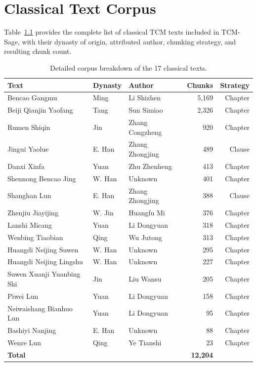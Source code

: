 \documentclass[11pt,a4paper]{report}
\begin{document}
\appendix
\chapter{Classical Text Corpus}

Table~\ref{tab:corpus_detail} provides the complete list of classical TCM texts included in TCM-Sage, with their dynasty of origin, attributed author, chunking strategy, and resulting chunk count.

\begin{table}[H]
\centering
\caption{Detailed corpus breakdown of the 17 classical texts.}
\label{tab:corpus_detail}
\begin{tabularx}{\textwidth}{lllrr}
\toprule
\textbf{Text} & \textbf{Dynasty} & \textbf{Author} & \textbf{Chunks} & \textbf{Strategy} \\
\midrule
Bencao Gangmu & Ming & Li Shizhen & 5,169 & Chapter \\
Beiji Qianjin Yaofang & Tang & Sun Simiao & 2,326 & Chapter \\
Rumen Shiqin & Jin & Zhang Congzheng & 920 & Chapter \\
Jingui Yaolue & E. Han & Zhang Zhongjing & 489 & Clause \\
Danxi Xinfa & Yuan & Zhu Zhenheng & 413 & Chapter \\
Shennong Bencao Jing & W. Han & Unknown & 401 & Chapter \\
Shanghan Lun & E. Han & Zhang Zhongjing & 388 & Clause \\
Zhenjiu Jiayijing & W. Jin & Huangfu Mi & 376 & Chapter \\
Lanshi Micang & Yuan & Li Dongyuan & 318 & Chapter \\
Wenbing Tiaobian & Qing & Wu Jutong & 313 & Chapter \\
Huangdi Neijing Suwen & W. Han & Unknown & 295 & Chapter \\
Huangdi Neijing Lingshu & W. Han & Unknown & 227 & Chapter \\
Suwen Xuanji Yuanbing Shi & Jin & Liu Wansu & 205 & Chapter \\
Piwei Lun & Yuan & Li Dongyuan & 158 & Chapter \\
Neiwaishang Bianhuo Lun & Yuan & Li Dongyuan & 95 & Chapter \\
Bashiyi Nanjing & E. Han & Unknown & 88 & Chapter \\
Wenre Lun & Qing & Ye Tianshi & 23 & Chapter \\
\midrule
\textbf{Total} & & & \textbf{12,204} & \\
\bottomrule
\end{tabularx}
\end{table}
\end{document}
